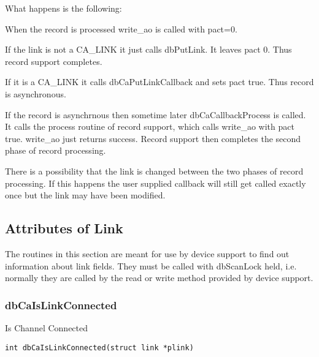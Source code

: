 What happens is the following:

\begin{description}

\item When the record is processed write\_ao is called with pact=0.

\begin{description}

\item If the link is not a CA\_LINK it just calls dbPutLink. It leaves pact 0. Thus record support completes.

\item If it is a CA\_LINK it calls dbCaPutLinkCallback and sets pact true. Thus record is asynchronous.

\end{description}

\item If the record is asynchrnous then sometime later dbCaCallbackProcess is called. It calls the process routine of record support, which calls write\_ao with pact true. write\_ao just returns success. Record support then completes the second phase of record processing.

\end{description}

There is a possibility that the link is changed between the two phases of record processing. If this happens the user supplied callback will still get called exactly once but the link may have been modified.

\subsection{Attributes of Link}

The routines in this section are meant for use by device support to find out information about link fields. They must be 
called with dbScanLock held, i.e. normally they are called by the read or write method provided by device support.

\subsubsection{dbCaIsLinkConnected}

Is Channel Connected

\begin{verbatim}
int dbCaIsLinkConnected(struct link *plink)
\end{verbatim}


